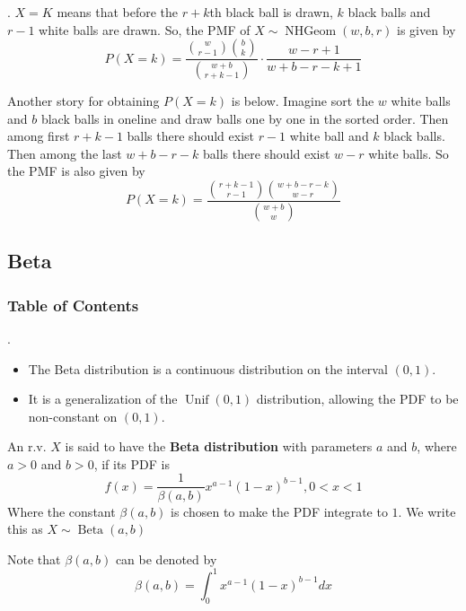\documentclass[8pt]{beamer}
\newcommand{\tb}[1]{\textbf{#1}}
\newcommand{\Unif}[2]{\operatorname{Unif}\!\left(#1, #2\right)}
\newcommand{\Beta}[2]{\operatorname{Beta}\!\left(#1, #2\right)}
\newcommand{\NHGeom}[3]{\operatorname{NHGeom}\!\left(#1,#2, #3\right)}
\begin{document}
\begin{frame}{.}
    $X=K$ means that before the $r+k$th black ball is drawn, $k$ black balls and $r-1$ white balls are drawn.
    So, the PMF of $X \sim \NHGeom{w}{b}{r}$ is given by
    \[
        P(X=k)= \frac{\binom{w}{r-1} \binom{b}{k}}{\binom{w+b}{r+k-1}} \cdot \frac{w-r+1}{w+b-r-k+1}
    \]

    Another story for obtaining $P(X=k)$ is below. Imagine sort the $w$ white balls and $b$ black balls in oneline and draw balls one by one in the sorted order. Then among first $r+k-1$ balls there should exist $r-1$ white ball and $k$ black balls. Then among the last $w+b-r-k$ balls there should exist $w-r$ white balls.
    So the PMF is also given by
    \[
        P(X=k) = \frac{\binom{r+k-1}{r-1} \binom{w+b-r-k}{w-r}}{\binom{w+b}{w}}
    \]

\end{frame}

\subsection{Beta}

\begingroup
    \begin{frame}
        \frametitle{Table of Contents}
        \tableofcontents[currentsubsection]
    \end{frame}
\endgroup

\begin{frame}{.}
    \begin{itemize}
        \item The Beta distribution is a continuous distribution on the interval $(0, 1)$.
        \item It is a generalization of the $\Unif{0}{1}$ distribution, allowing the PDF to be non-constant on $(0,1)$.
    \end{itemize}

    \begin{definition}
        An r.v. $X$ is said to have the \tb{Beta distribution} with parameters $a$ and $b$, where $a > 0$ and $b > 0$, if its PDF is
        \[
            f(x) = \frac{1}{\beta (a,b)} x^{a-1} (1-x)^{b-1}, 0<x<1
        \]
        Where the constant $\beta(a,b)$ is chosen to make the PDF integrate to $1$. We write this as $X \sim \Beta{a}{b}$

        Note that $\beta(a,b)$ can be denoted by
        \[
            \beta(a,b) = \int_{0}^{1} x^{a-1} (1-x)^{b-1} dx
        \]
    \end{definition}

\end{frame}
\end{document}
